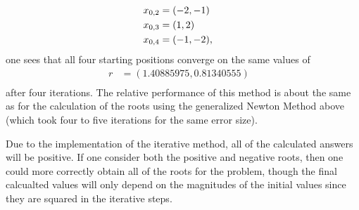 \documentclass[12pt]{article}
\DeclarePairedDelimiter\rb{(}{)}
\begin{document}
\begin{enumerate}
\begin{align*}
	x_{0,2} & =  \rb*{-2,-1 } &\\
	x_{0,3} & =  \rb*{1,2 } &\\
	x_{0,4} & =  \rb*{-1,-2 }, &\\
\end{align*}
one sees that all four starting positions converge on the same values of 
\begin{align*}
	r & = (1.40885975, 0.81340555)&\\
\end{align*}
after four iterations. The relative performance of this method is about the same as for the calculation of the roots using the generalized Newton Method above (which took four to five iterations for the same error size). 

Due to the implementation of the iterative method, all of the calculated answers will be positive. If one consider both the positive and negative roots, then one could more correctly obtain all of the roots for the problem, though the final calcualted values will only depend on the magnitudes of the initial values since they are squared in the iterative steps. 


\end{enumerate}
\end{document}
